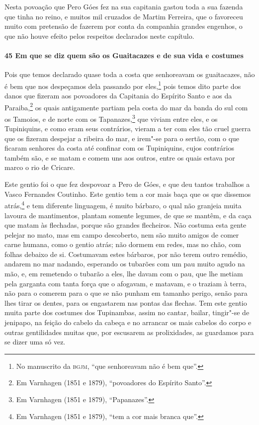 \begin{linenumbers}
Nesta povoação que Pero Góes fez na sua capitania gastou toda a sua fazenda que tinha no
reino, e muitos mil cruzados de Martim Ferreira, que o favoreceu muito com pretensão de
fazerem por conta da companhia grandes engenhos, o que não houve efeito pelos respeitos
declarados neste capítulo.

\paragraph{45 Em que se diz quem são os Guaitacazes e de sua vida e costumes} \quad
Pois que temos declarado quase toda a costa que senhoreavam os guaitacazes, não é bem que
nos despeçamos dela passando por eles,\footnote{ No manuscrito da \textsc{bgjm}, ``que
senhoreavam não é bem que''.} pois temos dito parte dos danos que fizeram aos povoadores
da Capitania do Espírito Santo e aos da Paraiba,\footnote{ Em Varnhagen (1851 e 1879),
``povoadores do Espírito Santo''.} os quais antigamente partiam pela costa do mar da banda
do sul com os Tamoios, e de norte com os Tapanazes,\footnote{ Em Varnhagen (1851 e 1879),
``Papanazes''.} que viviam entre eles, e os Tupiniquins, e como eram seus contrários,
vieram a ter com eles tão cruel guerra que os fizeram despejar a ribeira do mar, e irem"-se
para o sertão, com o que ficaram senhores da costa até confinar com os Tupiniquins, cujos
contrários também são, e se matam e comem uns aos outros, entre os quais estava por marco
o rio de Cricare.

Este gentio foi o que fez despovoar a Pero de Góes, e que deu tantos trabalhos a Vasco
Fernandes Coutinho. Este gentio tem a cor mais baça que os que dissemos atrás,\footnote{
Em Varnhagen (1851 e 1879), ``tem a cor mais branca que''.} e tem diferente linguagem, é
muito bárbaro, o qual não granjeia muita lavoura de mantimentos, plantam somente legumes,
de que se mantêm, e da caça que matam às flechadas, porque são grandes flecheiros. Não
costuma esta gente pelejar no mato, mas em campo descoberto, nem são muito amigos de comer
carne humana, como o gentio atrás; não dormem em redes, mas no chão, com folhas debaixo de
si. Costumavam estes bárbaros, por não terem outro remédio, andarem no mar nadando,
esperando os tubarões com um pau muito agudo na mão, e, em remetendo o tubarão a eles, lhe
davam com o pau, que lhe metiam pela garganta com tanta força que o afogavam, e matavam, e
o traziam à terra, não para o comerem para o que se não punham em tamanho perigo, senão
para lhes tirar os dentes, para os engastarem nas pontas das flechas. Tem este gentio
muita parte dos costumes dos Tupinambas, assim no cantar, bailar, tingir"-se de jenipapo,
na feição do cabelo da cabeça e no arrancar os mais cabelos do corpo e outras gentilidades
muitas que, por escusarem as prolixidades, as guardamos para se dizer uma só vez.


\end{linenumbers}
